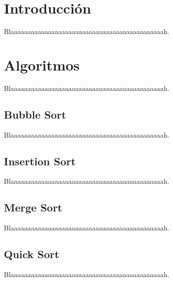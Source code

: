 \documentclass[11pt,letterpaper]{article}
\begin{document}

\tableofcontents
\listoffigures

\newpage
\section{Introducción}

Blaaaaaaaaaaaaaaaaaaaaaaaaaaaaaaaaaaaaaaaaaaaaah.

\newpage
\section{Algoritmos}

Blaaaaaaaaaaaaaaaaaaaaaaaaaaaaaaaaaaaaaaaaaaaaah.


\subsection{Bubble Sort}

Blaaaaaaaaaaaaaaaaaaaaaaaaaaaaaaaaaaaaaaaaaaaaah.

\subsection{Insertion Sort}

Blaaaaaaaaaaaaaaaaaaaaaaaaaaaaaaaaaaaaaaaaaaaaah.

\subsection{Merge Sort}

Blaaaaaaaaaaaaaaaaaaaaaaaaaaaaaaaaaaaaaaaaaaaaah.

\subsection{Quick Sort}

Blaaaaaaaaaaaaaaaaaaaaaaaaaaaaaaaaaaaaaaaaaaaaah.
\end{document}
